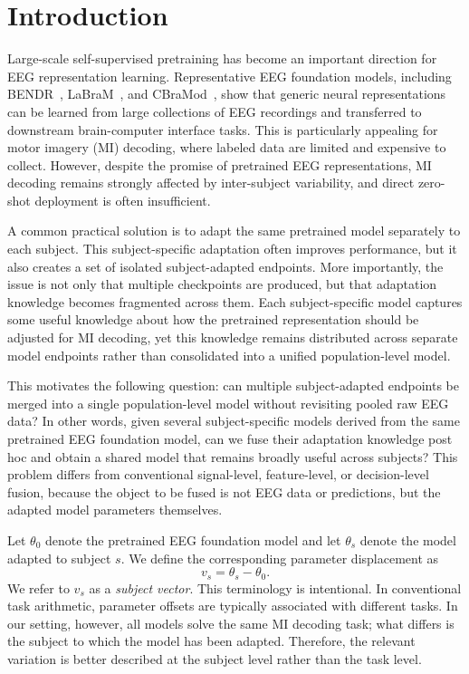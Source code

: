 \documentclass[conference]{IEEEtran}
\begin{document}
\section{Introduction}
Large-scale self-supervised pretraining has become an important direction for EEG representation learning. Representative EEG foundation models, including BENDR~\cite{b1}, LaBraM~\cite{b2}, and CBraMod~\cite{b3}, show that generic neural representations can be learned from large collections of EEG recordings and transferred to downstream brain-computer interface tasks. This is particularly appealing for motor imagery (MI) decoding, where labeled data are limited and expensive to collect. However, despite the promise of pretrained EEG representations, MI decoding remains strongly affected by inter-subject variability, and direct zero-shot deployment is often insufficient.

A common practical solution is to adapt the same pretrained model separately to each subject. This subject-specific adaptation often improves performance, but it also creates a set of isolated subject-adapted endpoints. More importantly, the issue is not only that multiple checkpoints are produced, but that adaptation knowledge becomes fragmented across them. Each subject-specific model captures some useful knowledge about how the pretrained representation should be adjusted for MI decoding, yet this knowledge remains distributed across separate model endpoints rather than consolidated into a unified population-level model.

This motivates the following question: can multiple subject-adapted endpoints be merged into a single population-level model without revisiting pooled raw EEG data? In other words, given several subject-specific models derived from the same pretrained EEG foundation model, can we fuse their adaptation knowledge post hoc and obtain a shared model that remains broadly useful across subjects? This problem differs from conventional signal-level, feature-level, or decision-level fusion, because the object to be fused is not EEG data or predictions, but the adapted model parameters themselves.

Let $\theta_0$ denote the pretrained EEG foundation model and let $\theta_s$ denote the model adapted to subject $s$. We define the corresponding parameter displacement as
\begin{equation}
v_s = \theta_s - \theta_0.
\end{equation}
We refer to $v_s$ as a \emph{subject vector}. This terminology is intentional. In conventional task arithmetic, parameter offsets are typically associated with different tasks. In our setting, however, all models solve the same MI decoding task; what differs is the subject to which the model has been adapted. Therefore, the relevant variation is better described at the subject level rather than the task level.
\end{document}

